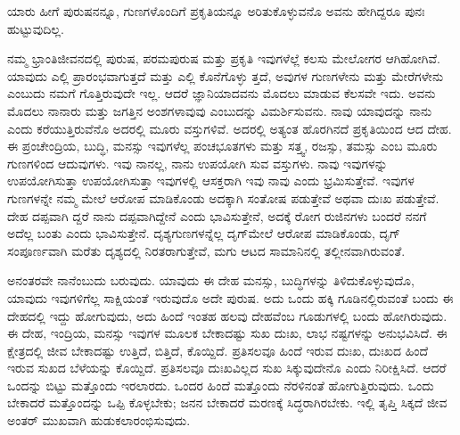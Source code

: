{\small ಯಾರು ಹೀಗೆ ಪುರುಷನನ್ನೂ, ಗುಣಗಳೊಂದಿಗೆ ಪ್ರಕೃತಿಯನ್ನೂ ಅರಿತುಕೊಳ್ಳುವನೊ ಅವನು ಹೇಗಿದ್ದರೂ ಪುನಃ ಹುಟ್ಟುವುದಿಲ್ಲ.}

ನಮ್ಮ ಭ್ರಾಂತಿಜೀವನದಲ್ಲಿ ಪುರುಷ, ಪರಮಪುರುಷ ಮತ್ತು ಪ್ರಕೃತಿ ಇವುಗಳೆಲ್ಲೆ ಕಲಸು ಮೇಲೋಗರ ಆಗಿಹೋಗಿವೆ. ಯಾವುದು ಎಲ್ಲಿ ಪ್ರಾರಂಭವಾಗುತ್ತದೆ ಮತ್ತು ಎಲ್ಲಿ ಕೊನೆಗೊಳ್ಳು ತ್ತದೆ, ಅವುಗಳ ಗುಣಗಳೇನು ಮತ್ತು ಮೇರೆಗಳೇನು ಎಂಬುದು ನಮಗೆ ಗೊತ್ತಿರುವುದೇ ಇಲ್ಲ. ಆದರೆ ಜ್ಞಾನಿಯಾದವನು ಮೊದಲು ಮಾಡುವ ಕೆಲಸವೇ ಇದು. ಅವನು ಮೊದಲು ನಾನಾರು ಮತ್ತು ಜಗತ್ತಿನ ಅಂಶಗಳಾವುವು ಎಂಬುದನ್ನು ವಿಮರ್ಶಿಸುವನು. ನಾವು ಯಾವುದನ್ನು ನಾನು ಎಂದು ಕರೆಯುತ್ತಿರುವೆನೊ ಅದರಲ್ಲಿ ಮೂರು ವಸ್ತುಗಳಿವೆ. ಅದರಲ್ಲಿ ಅತ್ಯಂತ ಹೊರಗಿನದೆ ಪ್ರಕೃತಿಯಿಂದ ಆದ ದೇಹ. ಈ ಪ್ರಂಚೇಂದ್ರಿಯ, ಬುದ್ಧಿ, ಮನಸ್ಸು ಇವುಗಳೆಲ್ಲ ಪಂಚಭೂತಗಳು ಮತ್ತು ಸತ್ತ್ವ, ರಜಸ್ಸು, ತಮಸ್ಸು ಎಂಬ ಮೂರು ಗುಣಗಳಿಂದ ಆದುವುಗಳು. ಇವು ನಾನಲ್ಲ, ನಾನು ಉಪಯೋಗಿ ಸುವ ವಸ್ತುಗಳು. ನಾವು ಇವುಗಳನ್ನು ಉಪಯೋಗಿಸುತ್ತಾ ಉಪಯೋಗಿಸುತ್ತಾ ಇವುಗಳಲ್ಲಿ ಆಸಕ್ತರಾಗಿ ಇವು ನಾವು ಎಂದು ಭ್ರಮಿಸುತ್ತೇವೆ. ಇವುಗಳ ಗುಣಗಳನ್ನೇ ನಮ್ಮ ಮೇಲೆ ಆರೋಪ ಮಾಡಿಕೊಂಡು ಅದಕ್ಕಾಗಿ ಸಂತೋಷ ಪಡುತ್ತೇವೆ ಅಥವಾ ದುಃಖ ಪಡುತ್ತೇವೆ. ದೇಹ ದಪ್ಪವಾಗಿ ದ್ದರೆ ನಾನು ದಪ್ಪವಾಗಿದ್ದೇನೆ ಎಂದು ಭಾವಿಸುತ್ತೇನೆ, ಅದಕ್ಕೆ ರೋಗ ರುಜಿನಗಳು ಬಂದರೆ ನನಗೆ ಅದೆಲ್ಲ ಬಂತು ಎಂದು ಭಾವಿಸುತ್ತೇನೆ. ದೃಶ್ಯಗುಣಗಳನ್ನೆಲ್ಲ ದೃಗ್​ಮೇಲೆ ಆರೋಪ ಮಾಡಿಕೊಂಡು, ದೃಗ್ ಸಂಪೂರ್ಣವಾಗಿ ಮರೆತು ದೃಶ್ಯದಲ್ಲಿ ನಿರತರಾಗುತ್ತೇವೆ, ಮಗು ಆಟದ ಸಾಮಾನಿನಲ್ಲಿ ತಲ್ಲೀನವಾಗಿರುವಂತೆ.

ಅನಂತರವೇ ನಾನೆಂಬುದು ಬರುವುದು. ಯಾವುದು ಈ ದೇಹ ಮನಸ್ಸು, ಬುದ್ಧಿಗಳನ್ನು ತಿಳಿದುಕೊಳ್ಳುವುದೊ, ಯಾವುದು ಇವುಗಳಿಗೆಲ್ಲ ಸಾಕ್ಷಿಯಂತೆ ಇರುವುದೊ ಅದೇ ಪುರುಷ. ಅದು ಒಂದು ಹಕ್ಕಿ ಗೂಡಿನಲ್ಲಿರುವಂತೆ ಬಂದು ಈ ದೇಹದಲ್ಲಿ ಇದ್ದು ಹೋಗುವುದು, ಅದು ಹಿಂದೆ ಇಂತಹ ಹಲವು ದೇಹವೆಂಬ ಗೂಡುಗಳಲ್ಲಿ ಬಂದು ಹೋಗಿರುವುದು. ಈ ದೇಹ, ಇಂದ್ರಿಯ, ಮನಸ್ಸು ಇವುಗಳ ಮೂಲಕ ಬೇಕಾದಷ್ಟು ಸುಖ ದುಃಖ, ಲಾಭ ನಷ್ಟಗಳನ್ನು ಅನುಭವಿಸಿದೆ. ಈ ಕ್ಷೇತ್ರದಲ್ಲಿ ಜೀವ ಬೇಕಾದಷ್ಟು ಉತ್ತಿದೆ, ಬಿತ್ತಿದೆ, ಕೊಯ್ದಿದೆ. ಪ್ರತಿಸಲವೂ ಹಿಂದೆ ಇರುವ ದುಃಖ, ದುಃಖದ ಹಿಂದೆ ಇರುವ ಸುಖದ ಬೆಳೆಯನ್ನು ಕೊಯ್ದಿದೆ. ಪ್ರತಿಸಲವೂ ದುಃಖವಿಲ್ಲದ ಸುಖ ಸಿಕ್ಕುವುದೇನೊ ಎಂದು ನಿರೀಕ್ಷಿಸಿದೆ. ಆದರೆ ಒಂದನ್ನು ಬಿಟ್ಟು ಮತ್ತೊಂದು ಇರಲಾರದು. ಒಂದರ ಹಿಂದೆ ಮತ್ತೊಂದು ನೆರಳಿನಂತೆ ಹೋಗುತ್ತಿರುವುದು. ಒಂದು ಬೇಕಾದರೆ ಮತ್ತೊಂದನ್ನು ಒಪ್ಪಿ ಕೊಳ್ಳಬೇಕು; ಜನನ ಬೇಕಾದರೆ ಮರಣಕ್ಕೆ ಸಿದ್ಧರಾಗಿರಬೇಕು. ಇಲ್ಲಿ ತೃಪ್ತಿ ಸಿಕ್ಕದೆ ಜೀವ ಅಂತರ್ ಮುಖವಾಗಿ ಹುಡುಕಲಾರಂಭಿಸುವುದು.

